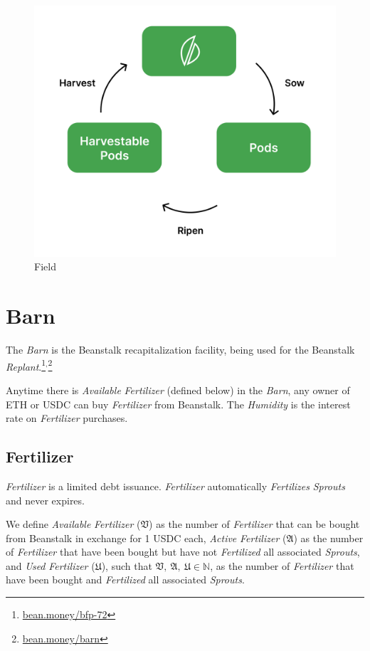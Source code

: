\documentclass[tikz]{article}
\newcommand{\term}[1]{\textsl{#1}}
\begin{document}
\begin{figure}[h!]
    \centering
    \includegraphics[scale=.14]{Figure2}
    \vspace*{-5mm}
    \caption{Field}
    \label{fig 2}
\end{figure}

\newpage
\section{Barn}
The \term{Barn} is the Beanstalk recapitalization facility, being used for the Beanstalk \term{Replant}.\footnote{\href{https://bean.money/bfp-72}{bean.money/bfp-72}}$^{,}$\footnote{\href{https://bean.money/barn}{bean.money/barn}}

Anytime there is \term{Available} \term{Fertilizer} (defined below) in the \term{Barn}, any owner of ETH or USDC can buy \term{Fertilizer} from Beanstalk. The \term{Humidity} is the interest rate on \term{Fertilizer} purchases.

\subsection{Fertilizer}
\term{Fertilizer} is a limited debt issuance. \term{Fertilizer} automatically \term{Fertilizes} \term{Sprouts} and never expires.

We define \term{Available} \term{Fertilizer} ($\mathfrak{V}$) as the number of \term{Fertilizer} that can be bought from Beanstalk in exchange for 1 USDC each, \term{Active} \term{Fertilizer} ($\mathfrak{A}$) as the number of \term{Fertilizer} that have been bought but have not \term{Fertilized} all associated \term{Sprouts}, and \term{Used} \term{Fertilizer} ($\mathfrak{U}$), such that $\mathfrak{V},\ \mathfrak{A},\ \mathfrak{U} \in \mathbb{N}$, as the number of \term{Fertilizer} that have been bought and \term{Fertilized} all associated \term{Sprouts}. 
\end{document}
